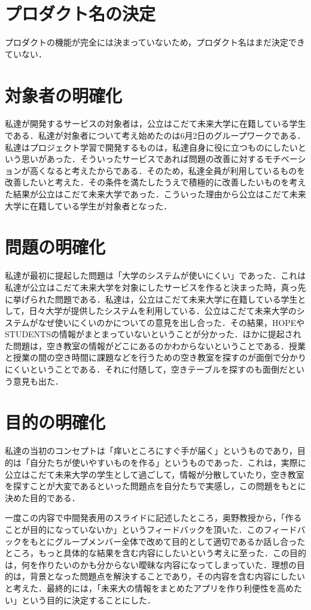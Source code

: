 \section{プロダクト名の決定}

プロダクトの機能が完全には決まっていないため，プロダクト名はまだ決定できていない．

\section{対象者の明確化}

私達が開発するサービスの対象者は，公立はこだて未来大学に在籍している学生である．私達が対象者について考え始めたのは6月2日のグループワークである．私達はプロジェクト学習で開発するものは，私達自身に役に立つものにしたいという思いがあった．そういったサービスであれば問題の改善に対するモチベーションが高くなると考えたからである．そのため，私達全員が利用しているものを改善したいと考えた．その条件を満たしたうえで積極的に改善したいものを考えた結果が公立はこだて未来大学であった．こういった理由から公立はこだて未来大学に在籍している学生が対象者となった．

\section{問題の明確化}

私達が最初に提起した問題は「大学のシステムが使いにくい」であった．これは私達が公立はこだて未来大学を対象にしたサービスを作ると決まった時，真っ先に挙げられた問題である．私達は，公立はこだて未来大学に在籍している学生として，日々大学が提供したシステムを利用している．公立はこだて未来大学のシステムがなぜ使いにくいのかについての意見を出し合った．その結果，HOPEやSTUDENTSの情報がまとまっていないということが分かった．ほかに提起された問題は，空き教室の情報がどこにあるのかわからないということである．授業と授業の間の空き時間に課題などを行うための空き教室を探すのが面倒で分かりにくいということである．それに付随して，空きテーブルを探すのも面倒だという意見も出た．

\section{目的の明確化}

私達の当初のコンセプトは「痒いところにすぐ手が届く」というものであり，目的は「自分たちが使いやすいものを作る」というものであった．これは，実際に公立はこだて未来大学の学生として過ごして，情報が分散していたり，空き教室を探すことが大変であるといった問題点を自分たちで実感し，この問題をもとに決めた目的である．\par
一度この内容で中間発表用のスライドに記述したところ，奥野教授から，「作ることが目的になっていないか」というフィードバックを頂いた．このフィードバックをもとにグループメンバー全体で改めて目的として適切であるか話し合ったところ，もっと具体的な結果を含む内容にしたいという考えに至った．この目的は，何を作りたいのかも分からない曖昧な内容になってしまっていた．理想の目的は，背景となった問題点を解決することであり，その内容を含む内容にしたいと考えた．最終的には，「未来大の情報をまとめたアプリを作り利便性を高めたい」という目的に決定することにした．

